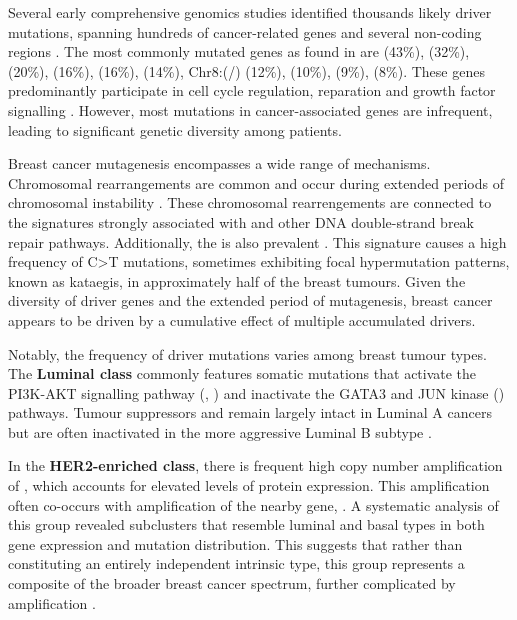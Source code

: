 Several early comprehensive genomics studies identified thousands likely driver mutations, spanning hundreds of cancer-related genes and several non-coding regions \parencite{Shah2009-xz, Cancer_Genome_Atlas_Network2012-gx,Shah2012-xz, Nik-Zainal2016-ek,Banerji2012-as,Ciriello2015-ey,Pereira2016-ov, Curtis2012-hu}. The most commonly mutated genes as found in \textcite{Cancer_Genome_Atlas_Network2012-gx} are  (43\%),  (32\%),  (20\%),  (16\%),  (16\%),  (14\%), Chr8:(/) (12\%),  (10\%),  (9\%),  (8\%). These genes predominantly participate in cell cycle regulation, reparation and growth factor signalling . However, most mutations in cancer-associated genes are infrequent, leading to significant genetic diversity among patients.

Breast cancer mutagenesis encompasses a wide range of mechanisms. Chromosomal rearrangements are common and occur during extended periods of chromosomal instability \parencite{Curtis2012-hu, Gerstung2020-sg,Nik-Zainal2012-zz}. These chromosomal rearrengements are connected to the signatures strongly associated with  and other DNA double-strand break repair pathways. Additionally, the  is also prevalent \parencite{Nik-Zainal2016-ek, Banerji2012-as, Nik-Zainal2012-vo}. This signature causes a high frequency of C>T mutations, sometimes exhibiting focal hypermutation patterns, known as kataegis, in approximately half of the breast tumours. Given the diversity of driver genes and the extended period of mutagenesis, breast cancer appears to be driven by a cumulative effect of multiple accumulated drivers.

Notably, the frequency of driver mutations varies among breast tumour types. The \textbf{Luminal class} commonly features somatic mutations that activate the PI3K-AKT signalling pathway (, ) and inactivate the GATA3 and JUN kinase () pathways. Tumour suppressors  and  remain largely intact in Luminal A cancers but are often inactivated in the more aggressive Luminal B subtype \parencite{Cancer_Genome_Atlas_Network2012-gx}.

In the \textbf{HER2-enriched class}, there is frequent high copy number amplification of , which accounts for elevated levels of  protein expression. This amplification often co-occurs with amplification of the nearby gene, . A systematic analysis of this group revealed subclusters that resemble luminal and basal types in both gene expression and mutation distribution. This suggests that rather than constituting an entirely independent intrinsic type, this group represents a composite of the broader breast cancer spectrum, further complicated by  amplification \parencite{Ferrari2016-qj}.

